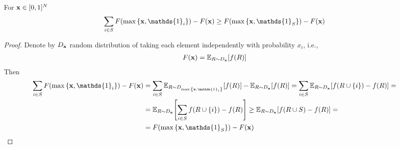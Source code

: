\begin{lemma}
	For $\vb{x}\in [0,1]^N$
	\begin{align}
	\sum_{i \in S} F\qty(\max\qty{\vb{x}, \mathds{1}_i})-F(\vb{x}) \geq F\qty(\max\qty{\vb{x}, \mathds{1}_{S}})-F(\vb{x})
	\end{align}
	\begin{proof}
		Denote by $D_{\vb{x}}$ random distribution of taking each element independently with probability $x_i$, i.e.,
		\begin{align}
		F(\vb{x}) = \mathbb{E}_{R\sim D_{\vb{x}}} [f(R)]
		\end{align}
		Then
		\begin{align}
		\sum_{i \in S} F\qty(\max\qty{\vb{x}, \mathds{1}_i})-F(\vb{x}) &= \sum_{i \in S} \mathbb{E}_{R\sim D_{\max\qty{\vb{x}, \mathds{1}_i}}} [f(R)] - \mathbb{E}_{R\sim D_{\vb{x}}} [f(R)] = \sum_{i \in S}\mathbb{E}_{R\sim D_{\vb{x}}}\qty[f(R\cup \qty{i}) - f(R)] =\\&= \mathbb{E}_{R\sim D_{\vb{x}}}\qty[\sum_{i \in S} f(R\cup \qty{i}) - f(R)] \geq \mathbb{E}_{R\sim D_{\vb{x}}}\qty[f(R\cup S) - f(R)] =\\&= F\qty(\max\qty{\vb{x}, \mathds{1}_{S}})-F(\vb{x})
		\end{align}
	\end{proof}
\end{lemma}
